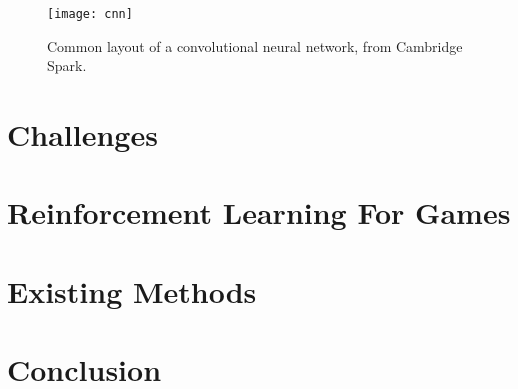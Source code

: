
\begin{figure}
    \centering
    \texttt{[image: cnn]}
    \caption{Common layout of a convolutional neural network, from
    Cambridge Spark\cite{cnn-layout}.}%
    \label{fig:cnn}
\end{figure}

\section{Challenges}

\section{Reinforcement Learning For Games}


\section{Existing Methods}

\section{Conclusion}
